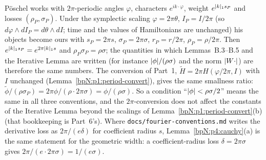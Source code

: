\begin{remark}\label{bpN:p4:dictionary}
P\"oschel works with $2\pi$-periodic angles $\varphi$, characters $e^{ik\cdot\varphi}$, weight $e^{\lvert k\rvert_1s_P}$ and losses $(\rho_P,\sigma_P)$.
Under the symplectic scaling $\varphi=2\pi\theta$, $I_P=I/2\pi$ (so $d\varphi\wedge dI_P=d\theta\wedge dI$; time and the values of Hamiltonians are unchanged) his objects become ours with
$s_P=2\pi s$, $\sigma_P=2\pi\sigma$, $r_P=r/2\pi$, $\rho_P=\rho/2\pi$. Then $e^{\lvert k\rvert_1s_P}=e^{2\pi\lvert k\rvert_1s}$ and $\rho_P\sigma_P=\rho\sigma$; the quantities in which Lemmas~B.3--B.5 and the Iterative Lemma are written
(for instance $\lvert \phi\rvert/(\rho\sigma)$ and the norm $\lvert W\cdot\rvert$) are therefore the same numbers. The conversion of Part~1, $\tilde H=2\pi H(\varphi/2\pi,I)$ with $I$ unchanged (Lemma~\ref{bpN:p1:period-convert}), gives the same
smallness ratio: $\tilde\phi/(\rho\sigma_P)=2\pi\phi/(\rho\cdot2\pi\sigma)=\phi/(\rho\sigma)$. So a condition ``$\lvert \phi\rvert<\rho\sigma/2$'' means the same in all three conventions, and the $2\pi$-conversion does not affect the constants of the Iterative Lemma
beyond the scalings of Lemma~\ref{bpN:p1:period-convert}(b) (that bookkeeping is Part~6's).
Where \texttt{docs/fourier-conventions.md} writes the derivative loss as $2\pi/(e\delta)$ for coefficient radius $s$, Lemma~\ref{bpN:p4:cauchy}(a) is the same statement for the geometric width: a coefficient-radius loss $\delta=2\pi\sigma$ gives $2\pi/(e\cdot2\pi\sigma)=1/(e\sigma)$.
\end{remark}
\endgroup

